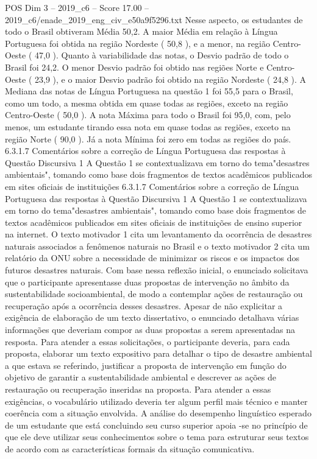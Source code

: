 \begin{textsample}{POS Dim 3 – 2019\_c6 – Score 17.00 – 2019\_c6/enade\_2019\_eng\_civ\_e50a9f5296.txt}
Nesse aspecto, os estudantes de todo o Brasil obtiveram Média 50,2.
A maior Média em relação à Língua Portuguesa foi obtida na região Nordeste ( 50,8 ), e a menor, na região Centro-Oeste ( 47,0 ).
Quanto à variabilidade das notas, o Desvio padrão de todo o Brasil foi 24,2.
O menor Desvio padrão foi obtido nas regiões Norte e Centro-Oeste ( 23,9 ), e o maior Desvio padrão foi obtido na região Nordeste ( 24,8 ).
A Mediana das notas de Língua Portuguesa na questão 1 foi 55,5 para o Brasil, como um todo, a mesma obtida em quase todas as regiões, exceto na região Centro-Oeste ( 50,0 ).
A nota Máxima para todo o Brasil foi 95,0, com, pelo menos, um estudante tirando essa nota em quase todas as regiões, exceto na região Norte ( 90,0 ).
Já a nota Mínima foi zero em todas as regiões do país. 6.3.1.7 Comentários sobre a correção de Língua Portuguesa das respostas à Questão Discursiva 1 A Questão 1 se contextualizava em torno do tema"desastres ambientais", tomando como base dois fragmentos de textos acadêmicos publicados em sites oficiais de instituições 6.3.1.7 Comentários sobre a correção de Língua Portuguesa das respostas à Questão Discursiva 1 A Questão 1 se contextualizava em torno do tema"desastres ambientais", tomando como base dois fragmentos de textos acadêmicos publicados em sites oficiais de instituições de ensino superior na internet.
O texto motivador 1 cita um levantamento da ocorrência de desastres naturais associados a fenômenos naturais no Brasil e o texto motivador 2 cita um relatório da ONU sobre a necessidade de minimizar os riscos e os impactos dos futuros desastres naturais.
Com base nessa reflexão inicial, o enunciado solicitava que o participante apresentasse duas propostas de intervenção no âmbito da sustentabilidade socioambiental, de modo a contemplar ações de restauração ou recuperação após a ocorrência desses desastres.
Apesar de não explicitar a exigência de elaboração de um texto dissertativo, o enunciado detalhava várias informações que deveriam compor as duas propostas a serem apresentadas na resposta.
Para atender a essas solicitações, o participante deveria, para cada proposta, elaborar um texto expositivo para detalhar o tipo de desastre ambiental a que estava se referindo, justificar a proposta de intervenção em função do objetivo de garantir a sustentabilidade ambiental e descrever as ações de restauração ou recuperação inseridas na proposta.
Para atender a essas exigências, o vocabulário utilizado deveria ter algum perfil mais técnico e manter coerência com a situação envolvida.
A análise do desempenho linguístico esperado de um estudante que está concluindo seu curso superior apoia -se no princípio de que ele deve utilizar seus conhecimentos sobre o tema para estruturar seus textos de acordo com as características formais da situação comunicativa.

\end{textsample}
